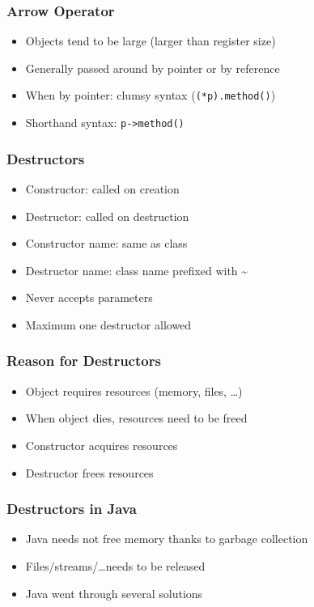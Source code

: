 \documentclass{../ucll-slides}
\begin{document}
\begin{frame}
  \frametitle{Arrow Operator}
  \begin{itemize}
    \item Objects tend to be large (larger than register size)
    \item Generally passed around by pointer or by reference
    \item When by pointer: clumsy syntax ({\tt (*p).method()})
    \item Shorthand syntax: {\tt p->method()}
  \end{itemize}
\end{frame}

\begin{frame}
  \frametitle{Destructors}
  \begin{itemize}
    \item Constructor: called on creation
    \item Destructor: called on destruction
    \item Constructor name: same as class
    \item Destructor name: class name prefixed with \~{}
    \item Never accepts parameters
    \item Maximum one destructor allowed
  \end{itemize}
  \vskip5mm
\end{frame}

\begin{frame}
  \frametitle{Reason for Destructors}
  \begin{itemize}
    \item Object requires resources (memory, files, \dots)
    \item When object dies, resources need to be freed
    \item Constructor acquires resources
    \item Destructor frees resources
  \end{itemize}
\end{frame}

\begin{frame}
  \frametitle{Destructors in Java}
  \begin{itemize}
    \item Java needs not free memory thanks to garbage collection
    \item Files/streams/\dots needs to be released
    \item Java went through several solutions
  \end{itemize}
\end{frame}
\end{document}
